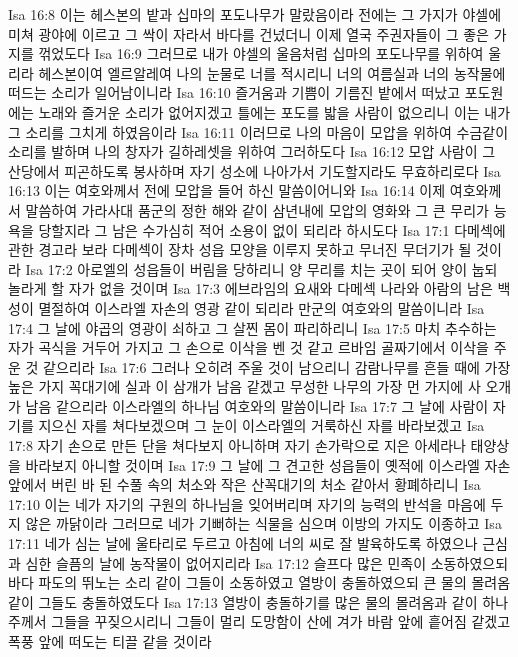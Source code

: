 Isa 16:8  이는 헤스본의 밭과 십마의 포도나무가 말랐음이라 전에는 그 가지가 야셀에 미쳐 광야에 이르고 그 싹이 자라서 바다를 건넜더니 이제 열국 주권자들이 그 좋은 가지를 꺾었도다
Isa 16:9  그러므로 내가 야셀의 울음처럼 십마의 포도나무를 위하여 울리라 헤스본이여 엘르알레여 나의 눈물로 너를 적시리니 너의 여름실과 너의 농작물에 떠드는 소리가 일어남이니라
Isa 16:10  즐거움과 기쁨이 기름진 밭에서 떠났고 포도원에는 노래와 즐거운 소리가 없어지겠고 틀에는 포도를 밟을 사람이 없으리니 이는 내가 그 소리를 그치게 하였음이라
Isa 16:11  이러므로 나의 마음이 모압을 위하여 수금같이 소리를 발하며 나의 창자가 길하레셋을 위하여 그러하도다
Isa 16:12  모압 사람이 그 산당에서 피곤하도록 봉사하며 자기 성소에 나아가서 기도할지라도 무효하리로다
Isa 16:13  이는 여호와께서 전에 모압을 들어 하신 말씀이어니와
Isa 16:14  이제 여호와께서 말씀하여 가라사대 품군의 정한 해와 같이 삼년내에 모압의 영화와 그 큰 무리가 능욕을 당할지라 그 남은 수가심히 적어 소용이 없이 되리라 하시도다
Isa 17:1  다메섹에 관한 경고라 보라 다메섹이 장차 성읍 모양을 이루지 못하고 무너진 무더기가 될 것이라
Isa 17:2  아로엘의 성읍들이 버림을 당하리니 양 무리를 치는 곳이 되어 양이 눕되 놀라게 할 자가 없을 것이며
Isa 17:3  에브라임의 요새와 다메섹 나라와 아람의 남은 백성이 멸절하여 이스라엘 자손의 영광 같이 되리라 만군의 여호와의 말씀이니라
Isa 17:4  그 날에 야곱의 영광이 쇠하고 그 살찐 몸이 파리하리니
Isa 17:5  마치 추수하는 자가 곡식을 거두어 가지고 그 손으로 이삭을 벤 것 같고 르바임 골짜기에서 이삭을 주운 것 같으리라
Isa 17:6  그러나 오히려 주울 것이 남으리니 감람나무를 흔들 때에 가장 높은 가지 꼭대기에 실과 이 삼개가 남음 같겠고 무성한 나무의 가장 먼 가지에 사 오개가 남음 같으리라 이스라엘의 하나님 여호와의 말씀이니라
Isa 17:7  그 날에 사람이 자기를 지으신 자를 쳐다보겠으며 그 눈이 이스라엘의 거룩하신 자를 바라보겠고
Isa 17:8  자기 손으로 만든 단을 쳐다보지 아니하며 자기 손가락으로 지은 아세라나 태양상을 바라보지 아니할 것이며
Isa 17:9  그 날에 그 견고한 성읍들이 옛적에 이스라엘 자손 앞에서 버린 바 된 수풀 속의 처소와 작은 산꼭대기의 처소 같아서 황폐하리니
Isa 17:10  이는 네가 자기의 구원의 하나님을 잊어버리며 자기의 능력의 반석을 마음에 두지 않은 까닭이라 그러므로 네가 기뻐하는 식물을 심으며 이방의 가지도 이종하고
Isa 17:11  네가 심는 날에 울타리로 두르고 아침에 너의 씨로 잘 발육하도록 하였으나 근심과 심한 슬픔의 날에 농작물이 없어지리라
Isa 17:12  슬프다 많은 민족이 소동하였으되 바다 파도의 뛰노는 소리 같이 그들이 소동하였고 열방이 충돌하였으되 큰 물의 몰려옴 같이 그들도 충돌하였도다
Isa 17:13  열방이 충돌하기를 많은 물의 몰려옴과 같이 하나 주께서 그들을 꾸짖으시리니 그들이 멀리 도망함이 산에 겨가 바람 앞에 흩어짐 같겠고 폭풍 앞에 떠도는 티끌 같을 것이라

